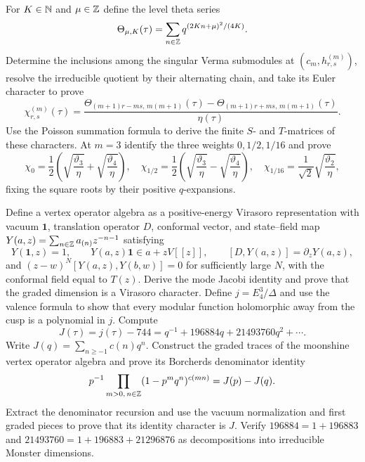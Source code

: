 \begin{exercise}
For $K\in\mathbb N$ and $\mu\in\mathbb Z$ define the level theta series
\[
 \Theta_{\mu,K}(\tau)
 =\sum_{n\in\mathbb Z}q^{(2Kn+\mu)^2/(4K)}.
\]
Determine the inclusions among the singular Verma submodules at
$(c_m,h_{r,s}^{(m)})$, resolve the irreducible quotient by their alternating
chain, and take its Euler character to prove
\[
 \chi_{r,s}^{(m)}(\tau)=
 \frac{\Theta_{(m+1)r-ms,\,m(m+1)}(\tau)
 -\Theta_{(m+1)r+ms,\,m(m+1)}(\tau)}{\eta(\tau)}.
\]
Use the Poisson summation formula to derive the finite
$S$- and $T$-matrices of these characters.  At $m=3$ identify the three
weights $0,1/2,1/16$ and prove
\[
 \chi_0=\frac12\left(\sqrt{\frac{\vartheta_3}{\eta}}
 +\sqrt{\frac{\vartheta_4}{\eta}}\right),\quad
 \chi_{1/2}=\frac12\left(\sqrt{\frac{\vartheta_3}{\eta}}
 -\sqrt{\frac{\vartheta_4}{\eta}}\right),\quad
 \chi_{1/16}=\frac1{\sqrt2}\sqrt{\frac{\vartheta_2}{\eta}},
\]
fixing the square roots by their positive $q$-expansions.
\end{exercise}

\begin{exercise}
Define a vertex operator algebra as a positive-energy Virasoro representation
with vacuum $\mathbf1$, translation operator $D$, conformal vector, and
state--field map
$Y(a,z)=\sum_{n\in\mathbb Z}a_{(n)}z^{-n-1}$ satisfying
\[
 Y(\mathbf1,z)=1,\qquad
 Y(a,z)\mathbf1\in a+zV[[z]],\qquad
 [D,Y(a,z)]=\partial_zY(a,z),
\]
and $(z-w)^N[Y(a,z),Y(b,w)]=0$ for sufficiently large $N$, with the
conformal field equal to $T(z)$.  Derive the mode Jacobi identity and prove
that the graded dimension is a Virasoro character.  Define $j=E_4^3/\Delta$
and use the
valence formula to show that every modular function holomorphic away from the
cusp is a polynomial in $j$.  Compute
\[
 J(\tau)=j(\tau)-744=q^{-1}+196884q+21493760q^2+\cdots.
\]
Write $J(q)=\sum_{n\geq-1}c(n)q^n$.  Construct the graded traces of the
moonshine vertex operator algebra and prove its Borcherds denominator identity
\[
 p^{-1}\prod_{m>0,\,n\in\mathbb Z}(1-p^mq^n)^{c(mn)}=J(p)-J(q).
\]
Extract the denominator recursion and use the vacuum normalization and first
graded pieces to prove that its identity character is $J$.
Verify
$196884=1+196883$ and
$21493760=1+196883+21296876$ as decompositions into irreducible Monster
dimensions.
\end{exercise}


